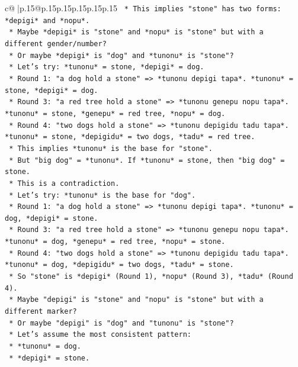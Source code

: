 \documentclass{article}
\begin{document}
{\begin{supertabular}{c@{$\;$}|p{.15\linewidth}@{}p{.15\linewidth}p{.15\linewidth}p{.15\linewidth}p{.15\linewidth}p{.15\linewidth}}
{{{\texttt{        *   This implies "stone" has two forms: *depigi* and *nopu*.} \\
\texttt{        *   Maybe *depigi* is "stone" and *nopu* is "stone" but with a different gender/number?} \\
\texttt{        *   Or maybe *depigi* is "dog" and *tunonu* is "stone"?} \\
\texttt{        *   Let's try: *tunonu* = stone, *depigi* = dog.} \\
\texttt{        *   Round 1: "a dog hold a stone" => *tunonu depigi tapa*. *tunonu* = stone, *depigi* = dog.} \\
\texttt{        *   Round 3: "a red tree hold a stone" => *tunonu genepu nopu tapa*. *tunonu* = stone, *genepu* = red tree, *nopu* = dog.} \\
\texttt{        *   Round 4: "two dogs hold a stone" => *tunonu depigidu tadu tapa*. *tunonu* = stone, *depigidu* = two dogs, *tadu* = red tree.} \\
\texttt{        *   This implies *tunonu* is the base for "stone".} \\
\texttt{        *   But "big dog" = *tunonu*. If *tunonu* = stone, then "big dog" = stone.} \\
\texttt{        *   This is a contradiction.} \\
\texttt{        *   Let's try: *tunonu* is the base for "dog".} \\
\texttt{        *   Round 1: "a dog hold a stone" => *tunonu depigi tapa*. *tunonu* = dog, *depigi* = stone.} \\
\texttt{        *   Round 3: "a red tree hold a stone" => *tunonu genepu nopu tapa*. *tunonu* = dog, *genepu* = red tree, *nopu* = stone.} \\
\texttt{        *   Round 4: "two dogs hold a stone" => *tunonu depigidu tadu tapa*. *tunonu* = dog, *depigidu* = two dogs, *tadu* = stone.} \\
\texttt{        *   So "stone" is *depigi* (Round 1), *nopu* (Round 3), *tadu* (Round 4).} \\
\texttt{        *   Maybe "depigi" is "stone" and "nopu" is "stone" but with a different marker?} \\
\texttt{        *   Or maybe "depigi" is "dog" and "tunonu" is "stone"?} \\
\texttt{        *   Let's assume the most consistent pattern:} \\
\texttt{        *   *tunonu* = dog.} \\
\texttt{        *   *depigi* = stone.} \\
}}}
\end{supertabular}}
\end{document}

